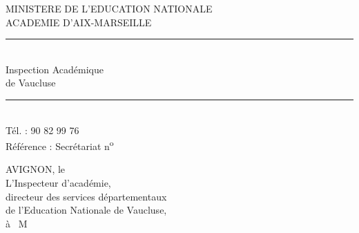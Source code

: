 MINISTERE DE L'EDUCATION NATIONALE\\
ACADEMIE D'AIX-MARSEILLE\\
\rule{2cm}{0.4pt}\\
Inspection Académique\\
de Vaucluse\\
\rule{2cm}{0.4pt}\\
Tél. : 90 82 99 76\\
Référence : Secrétariat n\textsuperscript{o}

AVIGNON, le\\[1ex]
L'Inspecteur d'académie,\\
directeur des services départementaux\\
de l'Education Nationale de Vaucluse,\\[1ex]
à \ M


